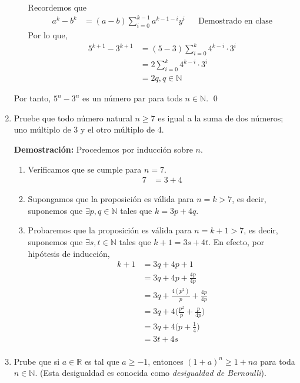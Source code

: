 \documentclass[11pt]{article}
\newcommand{\N}{\mathbb{N}}
\newcommand{\R}{\mathbb{R}}
\begin{document}
\begin{enumerate}
\begin{enumerate}[label=\roman*)]
  Recordemos que \begin{align*}
   a^k-b^k &= (a-b)\sum_{i=0}^{k-1} a^{k-1-i}y^{i} && \text{Demostrado en clase}
  \end{align*}
  Por lo que,
  \begin{align*}
   5^{k+1}-3^{k+1} &=(5-3)\sum_{i=0}^{k} 4^{k-i} \cdot 3^{i}\\
   &= 2 \sum_{i=0}^{k} 4^{k-i} \cdot 3^{i}\\
   &= 2 q, q \in \N
  \end{align*}
 \end{enumerate}
 Por tanto, $5^n-3^n$ es un número par para tods $n\in \N$. \qed

 \item Pruebe que todo número natural $n\geq 7$ es igual a la suma de dos números; uno múltiplo de 3 y el otro múltiplo de 4.
 
 \textbf{Demostración:} Procedemos por inducción sobre $n$. \begin{enumerate}[label=\roman*)]
  \item Verificamos que se cumple para $n=7$. \begin{align*}
   7 &= 3 + 4
  \end{align*}

  \item Supongamos que la proposición es válida para $n=k>7$, es decir, suponemos que $\exists p, q\in\N$ tales que $k=3p+4q$.
  \item Probaremos que la proposición es válida para $n=k+1>7$, es decir, suponemos que $\exists s,t\in \N$ tales que $k+1=3s+4t$. En efecto, por hipótesis	de inducción, \begin{align*}
   k + 1 &= 3q+4p + 1 \\
   &= 3q + 4p + \frac{4p}{4p}\\
   &= 3q + \frac{4(p^2)}{p} + \frac{4p}{4p}\\
   &= 3q + 4 \biggl(\frac{p^2}{p} + \frac{p}{4p}\biggr)\\
   &= 3q + 4 \biggl(p+ \frac{1}{4}\biggr)\\
   &= 3t + 4s \\
  \end{align*}
 \end{enumerate}

 \item Prube que si $a\in \R$ es tal que $a\geq -1$, entonces $(1+a)^n\geq 1+na$ para toda $n\in \N$. (Esta desigualdad es conocida como \textit{desigualdad de Bernoulli}).
 

\end{enumerate}
\end{document}
